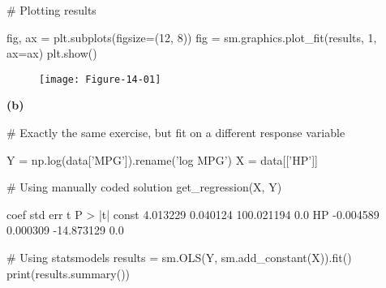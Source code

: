 \begin{python}
# Plotting results

fig, ax = plt.subplots(figsize=(12, 8))
fig = sm.graphics.plot_fit(results, 1, ax=ax)
plt.show()
\end{python}

\begin{figure}[H]
\texttt{[image: Figure-14-01]}
\end{figure}

\textbf{(b)}

\begin{python}
# Exactly the same exercise, but fit on a different response variable

Y = np.log(data['MPG']).rename('log MPG')
X = data[['HP']]
\end{python}

\begin{python}
# Using manually coded solution
get_regression(X, Y)
\end{python}

\begin{console}
	coef	std err	t	P > |t|
const	4.013229	0.040124	100.021194	0.0
HP	-0.004589	0.000309	-14.873129	0.0
\end{console}

\begin{python}
# Using statsmodels
results = sm.OLS(Y, sm.add_constant(X)).fit()
print(results.summary())
\end{python}

